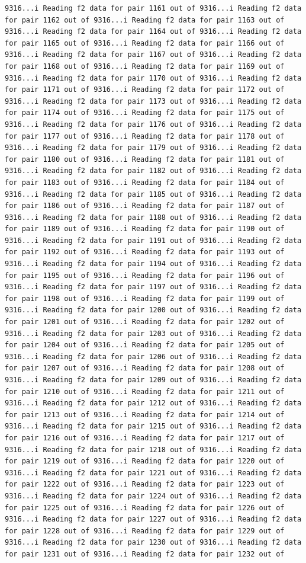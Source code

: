 \documentclass[
]{article}
\begin{document}
\begin{verbatim}
9316...i Reading f2 data for pair 1161 out of 9316...i Reading f2 data for pair 1162 out of 9316...i Reading f2 data for pair 1163 out of 9316...i Reading f2 data for pair 1164 out of 9316...i Reading f2 data for pair 1165 out of 9316...i Reading f2 data for pair 1166 out of 9316...i Reading f2 data for pair 1167 out of 9316...i Reading f2 data for pair 1168 out of 9316...i Reading f2 data for pair 1169 out of 9316...i Reading f2 data for pair 1170 out of 9316...i Reading f2 data for pair 1171 out of 9316...i Reading f2 data for pair 1172 out of 9316...i Reading f2 data for pair 1173 out of 9316...i Reading f2 data for pair 1174 out of 9316...i Reading f2 data for pair 1175 out of 9316...i Reading f2 data for pair 1176 out of 9316...i Reading f2 data for pair 1177 out of 9316...i Reading f2 data for pair 1178 out of 9316...i Reading f2 data for pair 1179 out of 9316...i Reading f2 data for pair 1180 out of 9316...i Reading f2 data for pair 1181 out of 9316...i Reading f2 data for pair 1182 out of 9316...i Reading f2 data for pair 1183 out of 9316...i Reading f2 data for pair 1184 out of 9316...i Reading f2 data for pair 1185 out of 9316...i Reading f2 data for pair 1186 out of 9316...i Reading f2 data for pair 1187 out of 9316...i Reading f2 data for pair 1188 out of 9316...i Reading f2 data for pair 1189 out of 9316...i Reading f2 data for pair 1190 out of 9316...i Reading f2 data for pair 1191 out of 9316...i Reading f2 data for pair 1192 out of 9316...i Reading f2 data for pair 1193 out of 9316...i Reading f2 data for pair 1194 out of 9316...i Reading f2 data for pair 1195 out of 9316...i Reading f2 data for pair 1196 out of 9316...i Reading f2 data for pair 1197 out of 9316...i Reading f2 data for pair 1198 out of 9316...i Reading f2 data for pair 1199 out of 9316...i Reading f2 data for pair 1200 out of 9316...i Reading f2 data for pair 1201 out of 9316...i Reading f2 data for pair 1202 out of 9316...i Reading f2 data for pair 1203 out of 9316...i Reading f2 data for pair 1204 out of 9316...i Reading f2 data for pair 1205 out of 9316...i Reading f2 data for pair 1206 out of 9316...i Reading f2 data for pair 1207 out of 9316...i Reading f2 data for pair 1208 out of 9316...i Reading f2 data for pair 1209 out of 9316...i Reading f2 data for pair 1210 out of 9316...i Reading f2 data for pair 1211 out of 9316...i Reading f2 data for pair 1212 out of 9316...i Reading f2 data for pair 1213 out of 9316...i Reading f2 data for pair 1214 out of 9316...i Reading f2 data for pair 1215 out of 9316...i Reading f2 data for pair 1216 out of 9316...i Reading f2 data for pair 1217 out of 9316...i Reading f2 data for pair 1218 out of 9316...i Reading f2 data for pair 1219 out of 9316...i Reading f2 data for pair 1220 out of 9316...i Reading f2 data for pair 1221 out of 9316...i Reading f2 data for pair 1222 out of 9316...i Reading f2 data for pair 1223 out of 9316...i Reading f2 data for pair 1224 out of 9316...i Reading f2 data for pair 1225 out of 9316...i Reading f2 data for pair 1226 out of 9316...i Reading f2 data for pair 1227 out of 9316...i Reading f2 data for pair 1228 out of 9316...i Reading f2 data for pair 1229 out of 9316...i Reading f2 data for pair 1230 out of 9316...i Reading f2 data for pair 1231 out of 9316...i Reading f2 data for pair 1232 out of 
\end{verbatim}
\end{document}
